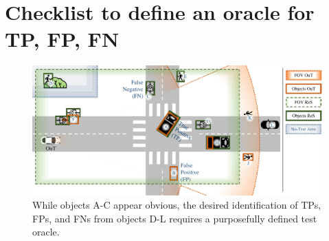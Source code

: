 \documentclass[conference]{IEEEtran}
\begin{document}






\section{Checklist to define an oracle for TP, FP, FN}
\label{sec:criteria}



\begin{figure}[t]
	\centering
	\vspace*{2mm}
	\includegraphics[width=\textwidth]{img/top_down_fitting_slide.pdf}
	
	\caption{ While objects A-C appear obvious, the desired identification of TPs, FPs, and FNs from objects D-L requires a purposefully defined test oracle. 
	}
	\label{fig:top_down_all}
\end{figure}
\end{document}
